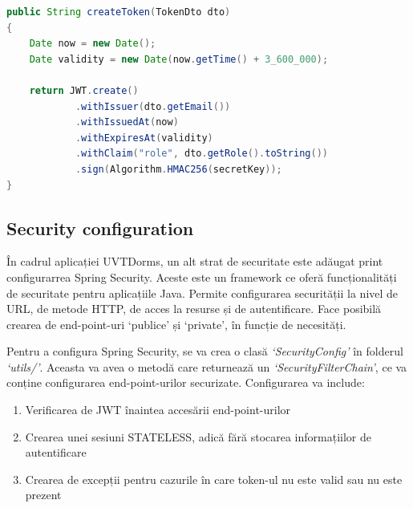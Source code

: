 \documentclass[12pt,a4paper]{report}
\theoremstyle{definition}
\theoremstyle{remark}
\begin{document}
\begin{lstlisting}[language=Java, caption={Funcția de generare a token-ului}]
public String createToken(TokenDto dto)
{
    Date now = new Date();
    Date validity = new Date(now.getTime() + 3_600_000);

    return JWT.create()
            .withIssuer(dto.getEmail())
            .withIssuedAt(now)
            .withExpiresAt(validity)
            .withClaim("role", dto.getRole().toString())
            .sign(Algorithm.HMAC256(secretKey));
}
\end{lstlisting}

\subsection{Security configuration}

\par În cadrul aplicației UVTDorms, un alt strat de securitate este adăugat print configurarrea Spring Security\cite{spilca2020spring}. Aceste este un framework ce oferă funcționalități de securitate pentru aplicațiile Java. Permite configurarea securității la nivel de URL, de metode HTTP, de acces la resurse și de autentificare. Face posibilă crearea de end-point-uri `publice' și `private', în funcție de necesități.

\par Pentru a configura Spring Security, se va crea o clasă \textit{`SecurityConfig'} în folderul \textit{`utils/'}. Aceasta va avea o metodă care returnează un \textit{`SecurityFilterChain'}, ce va conține configurarea end-point-urilor securizate. Configurarea va include:

\begin{enumerate}
    \item Verificarea de JWT înaintea accesării end-point-urilor
    \item Crearea unei sesiuni STATELESS, adică fără stocarea informațiilor de autentificare
    \item Crearea de excepții pentru cazurile în care token-ul nu este valid sau nu este prezent
\end{enumerate}
\end{document}
